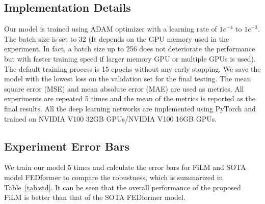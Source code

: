 \documentclass{article}
\begin{document}
\subsection{Implementation Details}
\label{app:exp:implement}
Our model is trained using ADAM \cite{kingma_adam:_2017} optimizer with a learning rate of $1e^{-4}$ to  $1e^{-3}$. The batch size is set to 32 (It depends on the GPU memory used in the experiment. In fact, a batch size up to 256 does not deteriorate the performance but with faster training speed if larger memory GPU or multiple GPUs is used). The default training process is 15 epochs without any early stopping. We save the model with the lowest loss on the validation set for the final testing. The mean square error (MSE) and mean absolute error (MAE) are used as metrics. All experiments are repeated 5 times and the mean of the metrics is reported as the final results. All the deep learning networks are implemented using PyTorch \cite{NEURIPS2019_9015_pytorch} and trained on NVIDIA V100 32GB GPUs/NVIDIA V100 16GB GPUs.

\subsection{Experiment Error Bars}
We train our model 5 times and calculate the error bars for FiLM and SOTA model FEDformer to compare the robustness, which is summarized in Table~\ref{tab:std}. It can be seen that the overall performance of the proposed FiLM is better than that of the SOTA FEDformer model.
\end{document}
